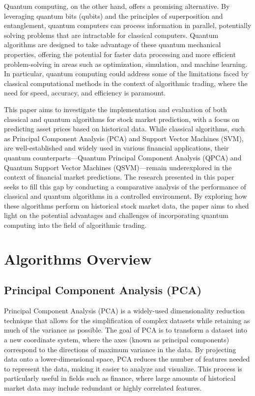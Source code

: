 \documentclass[journal]{IEEEtran}
\begin{document}
Quantum computing, on the other hand, offers a promising alternative. By leveraging quantum bits (qubits) and the principles of superposition and entanglement, quantum computers can process information in parallel, potentially solving problems that are intractable for classical computers. Quantum algorithms are designed to take advantage of these quantum mechanical properties, offering the potential for faster data processing and more efficient problem-solving in areas such as optimization, simulation, and machine learning. In particular, quantum computing could address some of the limitations faced by classical computational methods in the context of algorithmic trading, where the need for speed, accuracy, and efficiency is paramount.

This paper aims to investigate the implementation and evaluation of both classical and quantum algorithms for stock market prediction, with a focus on predicting asset prices based on historical data. While classical algorithms, such as Principal Component Analysis (PCA) and Support Vector Machines (SVM), are well-established and widely used in various financial applications, their quantum counterparts—Quantum Principal Component Analysis (QPCA) and Quantum Support Vector Machines (QSVM)—remain underexplored in the context of financial market predictions. The research presented in this paper seeks to fill this gap by conducting a comparative analysis of the performance of classical and quantum algorithms in a controlled environment. By exploring how these algorithms perform on historical stock market data, the paper aims to shed light on the potential advantages and challenges of incorporating quantum computing into the field of algorithmic trading.

\section{Algorithms Overview}
\subsection{Principal Component Analysis (PCA)}
Principal Component Analysis (PCA) \cite{pca} is a widely-used dimensionality reduction technique that allows for the simplification of complex datasets while retaining as much of the variance as possible. The goal of PCA is to transform a dataset into a new coordinate system, where the axes (known as principal components) correspond to the directions of maximum variance in the data. By projecting data onto a lower-dimensional space, PCA reduces the number of features needed to represent the data, making it easier to analyze and visualize. This process is particularly useful in fields such as finance, where large amounts of historical market data may include redundant or highly correlated features.
\end{document}
